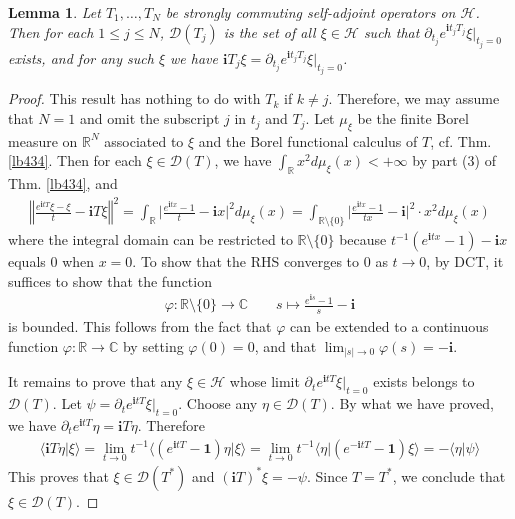 \documentclass[12pt,b5paper,notitlepage]{article}
\theoremstyle{definition}
\theoremstyle{plain}
\newtheorem{lm}[df]{Lemma}
\newcommand{\idt}{\mathbf{1}}
\newcommand{\Dom}{\mathscr{D}}
\newcommand{\bk}[1]{\langle {#1}\rangle}
\newcommand{\im}{\mathbf{i}}
\newcommand{\Cbb}{\mathbb C}
\newcommand{\Rbb}{\mathbb R}
\newcommand{\MH}{\mathcal H}
\numberwithin{equation}{section}
\begin{document}
\begin{lm}
Let $T_1,\dots,T_N$ be strongly commuting self-adjoint operators on $\MH$. Then for each $1\leq j\leq N$, $\Dom(T_j)$ is the set of all $\xi\in\MH$ such that $\partial_{t_j} e^{\im t_jT_j}\xi\big|_{t_j=0}$ exists, and for any such $\xi$ we have $\im T_j\xi=\partial_{t_j}e^{\im t_jT_j}\xi\big|_{t_j=0}$.
\end{lm}


\begin{proof}
This result has nothing to do with $T_k$ if $k\neq j$. Therefore, we may assume that $N=1$ and omit the subscript $j$ in $t_j$ and $T_j$. Let $\mu_\xi$ be the finite Borel measure on $\Rbb^N$ associated to $\xi$ and the Borel functional calculus of $T$, cf. Thm. \ref{lb434}. Then for each $\xi\in\Dom(T)$, we have $\int_\Rbb x^2d\mu_\xi(x)<+\infty$ by part (3) of Thm. \ref{lb434}, and
\begin{align*}
\left\Vert\frac{e^{\im tT}\xi-\xi}t-\im T\xi  \right\Vert^2=\int_\Rbb \Big|\frac{e^{\im tx}-1}t-\im x\Big|^2d\mu_\xi(x)=\int_{\Rbb\setminus\{0\}} \Big|\frac{e^{\im tx}-1}{tx}-\im \Big|^2\cdot x^2d\mu_\xi(x)
\end{align*}
where the integral domain can be restricted to $\Rbb\setminus\{0\}$ because $t^{-1}(e^{\im tx}-1)-\im x$ equals $0$ when $x=0$. To show that the RHS converges to $0$ as $t\rightarrow0$, by DCT, it suffices to show that the function
\begin{align*}
\varphi:\Rbb\setminus\{0\}\rightarrow\Cbb\qquad s\mapsto \frac{e^{\im s}-1}{s}-\im
\end{align*}
is bounded. This follows from the fact that $\varphi$ can be extended to a continuous function $\varphi:\Rbb\rightarrow\Cbb$ by setting $\varphi(0)=0$, and that $\lim_{|s|\rightarrow0}\varphi(s)=-\im$.

It remains to prove that any $\xi\in\MH$ whose limit $\partial_t e^{\im tT}\xi|_{t=0}$ exists belongs to $\Dom(T)$. Let $\psi=\partial_t e^{\im tT}\xi|_{t=0}$. Choose any $\eta\in\Dom(T)$. By what we have proved, we have $\partial_t e^{\im tT}\eta=\im T\eta$. Therefore
\begin{align*}
\bk{\im T\eta|\xi}=\lim_{t\rightarrow0}t^{-1}\bk{(e^{\im tT}-\idt)\eta|\xi}=\lim_{t\rightarrow0}t^{-1}\bk{\eta|(e^{-\im tT}-\idt)\xi}=-\bk{\eta|\psi}
\end{align*}
This proves that $\xi\in\Dom(T^*)$ and $(\im T)^*\xi=-\psi$. Since $T=T^*$, we conclude that $\xi\in\Dom(T)$.
\end{proof}
\end{document}

